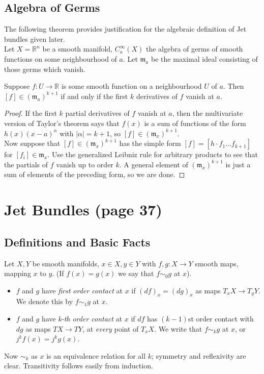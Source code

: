\documentclass[12pt]{article}
\newcommand{\RR}{\mathbb{R}}
\begin{document}
\subsection*{Algebra of Germs}
The following theorem provides justification for the algebraic definition of Jet bundles given later. \\

Let $X = \RR^n$ be a smooth manifold, $C_a^\infty(X)$ the algebra of germs of smooth functions on some neighbourhood of $a$. Let $\mathfrak{m}_a$ be the maximal ideal consisting of those germs which vanish. 

\begin{theorem}
    Suppose $f: U \to \RR$ is some smooth function on a neighbourhood $U$ of $a$. Then $[f] \in (\mathfrak{m}_a)^{k+1}$ if and only if the first $k$ derivatives of $f$ vanish at $a$. 
\end{theorem}

\begin{proof}
    If the first $k$ partial derivatives of $f$ vanish at $a$, then the multivariate version of Taylor's theorem says that $f(x)$ is a sum of functions of the form $h(x) (x-a)^{\alpha}$ with $|\alpha| = k+1$, so $[f] \in (\mathfrak{m}_x)^{k+1}$. \\
    
    Now suppose that $[f]\in (\mathfrak{m}_x)^{k+1}$ has the simple form $[f] = [h\cdot f_1 \dots  f_{k+1}]$ for $[f_i] \in \mathfrak{m}_x$. Use the generalized Leibniz rule for arbitrary products to see that the partials of $f$ vanish up to order $k$. A general element of $(\mathfrak{m}_x)^{k+1}$ is just a sum of elements of the preceding form, so we are done. 
\end{proof}

\section{Jet Bundles (page 37)}
\subsection{Definitions and Basic Facts}

\begin{definition}
    Let $X, Y$ be smooth manifolds, $x\in X, y\in Y$ with $f, g: X \to Y$ smooth maps, mapping $x$ to $y$. (If $f(x) = g(x)$ we say that $f \sim_0 g$ at $x$). 
    \begin{itemize}
        \item $f$ and $g$ have \emph{first order contact} at $x$ if $(df)_x = (dg)_x$ as maps $T_x X \to T_y Y$. We denote this by $f \sim_1 g$ at $x$. 
        
        \item $f$ and $g$ have \emph{k-th order contact} at $x$ if $df$ has $(k-1)$st order contact with $dg$ as maps $TX \to TY$, at \emph{every} point of $T_x X$. We write that $f \sim_k g$ at $x$, or $j^k f (x)= j^k g (x)$. 
        
    \end{itemize}
     Now $\sim_k$ as $x$ is an equivalence relation for all $k$; symmetry and reflexivity are clear. Transitivity follows easily from induction. 
\end{definition}
\end{document}
